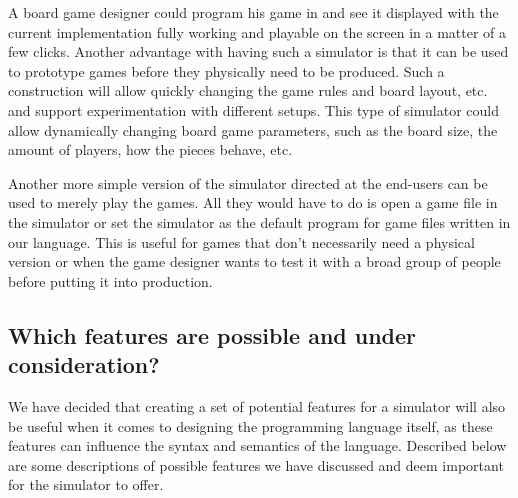 A board game designer could program his game in \productname{} and see it
displayed with the current implementation fully working and playable on the
screen in a matter of a few clicks. Another advantage with having such a
simulator is that it can be used to prototype games before they physically need
to be produced. Such a construction will allow quickly changing the game rules
and board layout, etc. and support experimentation with different setups. This
type of simulator could allow dynamically changing board game parameters, such
as the board size, the amount of players, how the pieces behave, etc.

Another more simple version of the simulator directed at the end-users can be
used to merely play the games. All they would have to do is open a game file in
the simulator or set the simulator as the default program for game files written
in our language. This is useful for games that don't necessarily need a physical
version or when the game designer wants to test it with a broad group of people
before putting it into production.

\subsection{Which features are possible and under consideration?}
We have decided that creating a set of potential features for a simulator will also be
useful when it comes to designing the programming language itself, as these
features can influence the syntax and semantics of the \productname{} language.
Described below are some descriptions of possible features we have discussed and
deem important for the simulator to offer.

